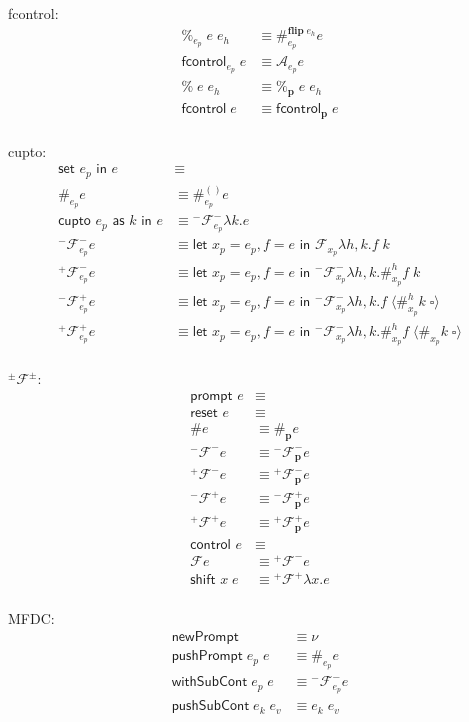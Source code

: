 \documentclass[11pt]{article}
\newcommand\x{\lambda x}
\newcommand{\letin}[2]{\textsf{let }#1\textsf{ in }#2}
\newcommand\F{\mathcal{F}}
\newcommand\pmFpm{^\pm\F^\pm}
\newcommand{\angles}[1]{\langle#1\rangle}
\begin{document}
fcontrol:
\begin{align*}
\%_{e_p}\;e\;e_h &\equiv
	\#_{e_p}^{\textbf{flip}\;e_h}e
	\\
\textsf{fcontrol}_{e_p}\;e &\equiv
	\mathcal A_{e_p}e
	\\
\%\;e\;e_h &\equiv
	\%_\mathbf{p}\;e\;e_h
	\\
\textsf{fcontrol}\;e &\equiv
	\textsf{fcontrol}_\mathbf{p}\;e
	\\
\end{align*}

cupto:
\begin{align*}
\textsf{set }e_p\textsf{ in }e &\equiv \\
	\#_{e_p}e &\equiv
	\#_{e_p}^{()}e
	\\
\textsf{cupto }e_p\textsf{ as }k\textsf{ in }e &\equiv
	{}^-\F^-_{e_p}\lambda k.e
	\\
^-\F^-_{e_p}e &\equiv
	\letin{x_p = e_p,f=e}{\F_{x_p}\lambda h,k.f\;k}
	\\
^+\F^-_{e_p}e &\equiv
	\letin{x_p=e_p,f=e}{^-\F_{x_p}^-\lambda h,k.\#_{x_p}^hf\;k}
	\\
^-\F^+_{e_p}e &\equiv
	\letin{x_p=e_p,f=e}{^-\F_{x_p}^-\lambda h,k.f\;\angles{\#_{x_p}^hk\;\square}}
	\\
^+\F^+_{e_p}e &\equiv
	\letin{x_p=e_p,f=e}{^-\F_{x_p}^-\lambda h,k.\#_{x_p}^hf\;\angles{\#_{x_p}k\;\square}}
	\\
\end{align*}

$\pmFpm$:
\begin{align*}
\textsf{prompt }e &\equiv\\
	\textsf{reset }e &\equiv\\
	\#e &\equiv
	\#_\mathbf{p}e
	\\
^-\F^-e &\equiv {}^-\F^-_\mathbf{p}e \\
^+\F^-e &\equiv {}^+\F^-_\mathbf{p}e \\
^-\F^+e &\equiv {}^-\F^+_\mathbf{p}e \\
^+\F^+e &\equiv {}^+\F^+_\mathbf{p}e \\
\textsf{control }e &\equiv\\
	\F e &\equiv
	{}^+\F^-e
	\\
\textsf{shift }x\;e &\equiv
	{}^+\F^+\x.e
	\\
\end{align*}

MFDC:
\begin{align*}
\textsf{newPrompt} &\equiv \nu \\
\textsf{pushPrompt}\;e_p\;e &\equiv
	\#_{e_p}e
	\\
\textsf{withSubCont}\;e_p\;e &\equiv
	{}^-\F^-_{e_p}e
	\\
\textsf{pushSubCont}\;e_k\;e_v &\equiv e_k\;e_v \\
\end{align*}
\end{document}

